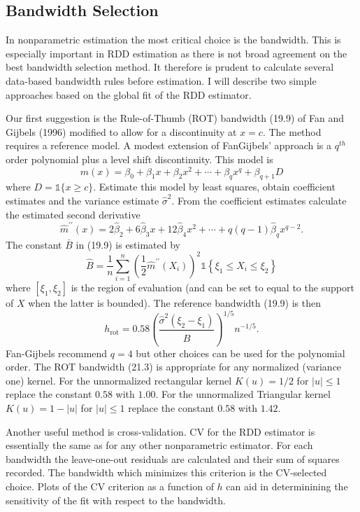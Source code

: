 \documentclass[10pt]{article}
\begin{document}
\subsection{Bandwidth Selection}
In nonparametric estimation the most critical choice is the bandwidth. This is especially important in RDD estimation as there is not broad agreement on the best bandwidth selection method. It therefore is prudent to calculate several data-based bandwidth rules before estimation. I will describe two simple approaches based on the global fit of the RDD estimator.

Our first suggestion is the Rule-of-Thumb (ROT) bandwidth (19.9) of Fan and Gijbels (1996) modified to allow for a discontinuity at $x=c$. The method requires a reference model. A modest extension of FanGijbels' approach is a $q^{t h}$ order polynomial plus a level shift discontinuity. This model is
$$
m(x)=\beta_{0}+\beta_{1} x+\beta_{2} x^{2}+\cdots+\beta_{q} x^{q}+\beta_{q+1} D
$$
where $D=\mathbb{1}\{x \geq c\}$. Estimate this model by least squares, obtain coefficient estimates and the variance estimate $\widehat{\sigma}^{2}$. From the coefficient estimates calculate the estimated second derivative
$$
\widehat{m}^{\prime \prime}(x)=2 \widehat{\beta}_{2}+6 \widehat{\beta}_{3} x+12 \widehat{\beta}_{4} x^{2}+\cdots+q(q-1) \widehat{\beta}_{q} x^{q-2} .
$$
The constant $\bar{B}$ in (19.9) is estimated by
$$
\widehat{B}=\frac{1}{n} \sum_{i=1}^{n}\left(\frac{1}{2} \widehat{m}^{\prime \prime}\left(X_{i}\right)\right)^{2} \mathbb{1}\left\{\xi_{1} \leq X_{i} \leq \xi_{2}\right\}
$$
where $\left[\xi_{1}, \xi_{2}\right]$ is the region of evaluation (and can be set to equal to the support of $X$ when the latter is bounded). The reference bandwidth (19.9) is then
$$
h_{\mathrm{rot}}=0.58\left(\frac{\widehat{\sigma}^{2}\left(\xi_{2}-\xi_{1}\right)}{\widehat{B}}\right)^{1 / 5} n^{-1 / 5} .
$$
Fan-Gijbels recommend $q=4$ but other choices can be used for the polynomial order. The ROT bandwidth (21.3) is appropriate for any normalized (variance one) kernel. For the unnormalized rectangular kernel $K(u)=1 / 2$ for $|u| \leq 1$ replace the constant $0.58$ with $1.00$. For the unnormalized Triangular kernel $K(u)=1-|u|$ for $|u| \leq 1$ replace the constant $0.58$ with $1.42$.

Another useful method is cross-validation. CV for the RDD estimator is essentially the same as for any other nonparametric estimator. For each bandwidth the leave-one-out residuals are calculated and their sum of squares recorded. The bandwidth which minimizes this criterion is the CV-selected choice. Plots of the CV criterion as a function of $h$ can aid in determinining the sensitivity of the fit with respect to the bandwidth.
\end{document}
